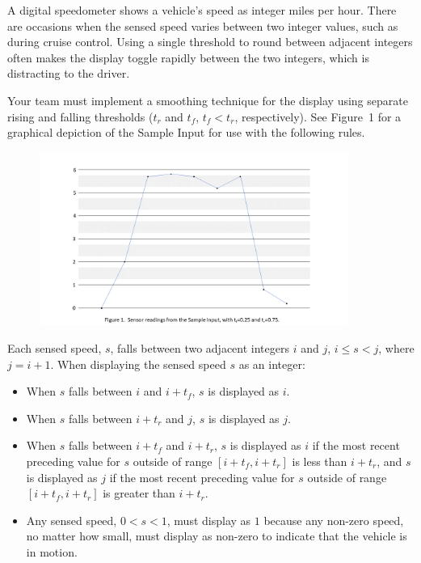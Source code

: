 \par
A digital speedometer shows a vehicle's speed as integer miles per
hour.  There are occasions when the sensed speed varies between two
integer values, such as during cruise control.  Using a single
threshold to round between adjacent integers often makes the display
toggle rapidly between the two integers, which is distracting to the
driver.
\par
Your team must implement a smoothing technique for the display using 
separate rising and falling thresholds ($t_r$ and $t_f$, $t_f < t_r$, respectively).
See Figure~1 for a graphical depiction of the Sample Input for use with
the following rules.
\begin{figure}[h]
	\begin{center}
		\includegraphics[width=0.9\textwidth]{speedometer-Figure-1.png}
	\end{center}
	\label{fig:sample}
\end{figure}
\par
%
Each sensed speed, $s$, falls between two adjacent integers $i$ and $j$,
$i \le s < j$, where $j = i + 1$.  When displaying the sensed speed $s$
as an integer:
\begin{itemize}
	\item When $s$ falls between $i$ and $i+t_f$, $s$ is displayed as $i$.
	\item When $s$ falls between $i+t_r$ and $j$, $s$ is displayed as $j$.
	\item When $s$ falls between $i+t_f$ and $i+t_r$, $s$ is displayed as $i$ if the most recent preceding value for $s$ outside of range $[i+t_f, i+t_r]$ is less than $i+t_r$, and $s$ is displayed as $j$ if the most recent preceding value for $s$ outside of range $[i+t_f, i+t_r]$ is greater than $i+t_r$.
	\item Any sensed speed, $0 < s < 1$, must display as $1$ because any non-zero speed,
	no matter how small, must display as non-zero to indicate that the vehicle is in motion.
\end{itemize}


